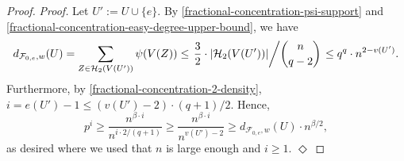 \documentclass[11pt]{article}
\numberwithin{equation}{section}
\newcommand{\mc}[1]{\mathcal{#1}}
\newcounter{i}
\theoremstyle{plain}
\newenvironment{proofclaim}[1][]%
{\noindent \emph{Proof.} {}{#1}{}}{\hfill
	$\Diamond$\vspace{1em}}
\theoremstyle{plain} %
\theoremstyle{definition}
\newcommand{\cF}{\mathcal{F}}
\newcommand{\cH}{\mathcal{H}}
\begin{document}
\begin{proof}
\begin{proofclaim}
Let $U':= U\cup \{e\}$. By \eqref{fractional-concentration-psi-support} and \ref{fractional-concentration-easy-degree-upper-bound}, we have
$$d_{\cF_{0,e},w}(U) = \sum_{Z\in \mc{H}_2(V(U'))} \psi(V(Z)) \leq \left.\frac{3}{2}\cdot |\cH_2(V(U'))|\middle/\binom{n}{q - 2}\right. \leq q^q\cdot n^{2 - v(U')}.$$
Furthermore, by \ref{fractional-concentration-2-density}, $i=e(U')-1\le (v(U')-2)\cdot (q+1) / 2$. Hence,
$$p^i \ge \frac{n^{\beta\cdot i}}{n^{i\cdot 2/(q+1)}} \geq \frac{n^{\beta\cdot i}}{n^{v(U')-2}} \ge d_{\cF_{0,e},w}(U) \cdot n^{\beta/2},$$
as desired where we used that $n$ is large enough and $i\ge 1$. 
\end{proofclaim}




\end{proof}
\end{document}
